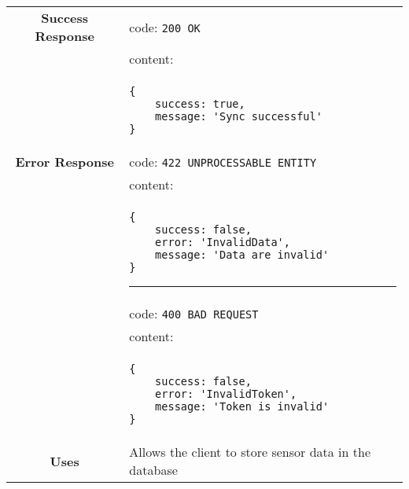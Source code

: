 \begin{adjustwidth}{1cm}{}
\begin{longtable}{|c|l|}
            \hline
            \textbf{Success Response} & code: \texttt{200 OK} \\
            &                           content: \\
            & \begin{minipage}[t]{0.5\textwidth}
                \begin{adjustwidth}{1.5cm}{}
                \begin{verbatim}
{
    success: true, 
    message: 'Sync successful'
}
                \end{verbatim}
                \end{adjustwidth}
              \end{minipage} \\
              \hline
            \textbf{Error Response} & code: \texttt{422 UNPROCESSABLE ENTITY} \\
            &                         content: \\
            & \begin{minipage}[t]{0.7\textwidth}
                \begin{adjustwidth}{1.5cm}{}
                \begin{verbatim}
{
    success: false, 
    error: 'InvalidData',
    message: 'Data are invalid'
}
                \end{verbatim}
                \end{adjustwidth}
                \par\noindent\rule{\textwidth}{1pt}
                 \vspace{4pt}
              \end{minipage} \\
          &                         code: \texttt{400 BAD REQUEST} \\
          &                         content: \\
          & \begin{minipage}[t]{0.7\textwidth}
            \begin{adjustwidth}{1.5cm}{}
                \begin{verbatim}
{
    success: false, 
    error: 'InvalidToken',
    message: 'Token is invalid'
}
                \end{verbatim}
                \end{adjustwidth}
          \end{minipage} \\
              \hline
            \textbf{Uses} & Allows the client to store sensor data in the database \\

\end{longtable}
\end{adjustwidth}
